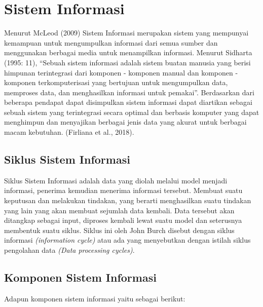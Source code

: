 \section{Sistem Informasi}
Menurut McLeod (2009) Sistem Informasi merupakan sistem yang mempunyai kemampuan untuk mengumpulkan informasi dari semua sumber dan menggunakan berbagai media untuk menampilkan informasi. Menurut Sidharta (1995: 11), “Sebuah sistem informasi adalah sistem buatan manusia yang berisi himpunan terintegrasi dari komponen - komponen manual dan komponen - komponen terkomputerisasi yang bertujuan untuk mengumpulkan data, memproses data, dan menghasilkan informasi untuk pemakai”. Berdasarkan dari beberapa pendapat dapat disimpulkan sistem informasi dapat diartikan sebagai sebuah sistem yang terintegrasi secara optimal dan berbasis komputer yang dapat menghimpun dan menyajikan berbagai jenis data yang akurat untuk berbagai macam kebutuhan. (Firliana et al., 2018).

\subsection{Siklus Sistem Informasi}
Siklus Sistem Informasi adalah data yang diolah melalui model menjadi informasi, penerima kemudian menerima informasi tersebut. Membuat suatu keputusan dan melakukan tindakan, yang berarti menghasilkan suatu tindakan yang lain yang akan membuat sejumlah data kembali. Data tersebut akan ditangkap sebagai input, diproses kembali lewat suatu model dan seterusnya membentuk suatu siklus. Siklus ini oleh John Burch disebut dengan siklus informasi \textit{(information cycle)} atau ada yang menyebutkan dengan istilah siklus pengolahan data \textit{(Data processing cycles)}.

\subsection{Komponen Sistem Informasi}
\par Adapun komponen sistem informasi yaitu sebagai berikut:

